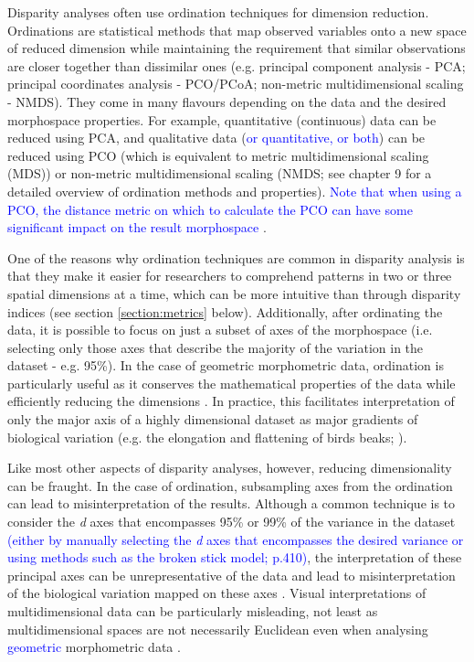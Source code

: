 \documentclass[12pt,letterpaper]{article}
\begin{document}
Disparity analyses often use ordination techniques for dimension reduction.
Ordinations are statistical methods that map observed variables onto a new space of reduced dimension while maintaining the requirement that similar observations are closer together than dissimilar ones (e.g. principal component analysis - PCA; principal coordinates analysis - PCO/PCoA; non-metric multidimensional scaling - NMDS).
They come in many flavours depending on the data and the desired morphospace properties.
For example, quantitative (continuous) data can be reduced using PCA, and qualitative data (\textcolor{blue}{or quantitative, or both}) can be reduced using PCO (which is equivalent to metric multidimensional scaling (MDS)) or non-metric multidimensional scaling (NMDS; see \citealt{Legendre2012} chapter 9 for a detailed overview of ordination methods and properties).
\textcolor{blue}{Note that when using a PCO, the distance metric on which to calculate the PCO can have some significant impact on the result morphospace} \citep{lehmann2019}.

One of the reasons why ordination techniques are common in disparity analysis is that they make it easier for researchers to comprehend patterns in two or three spatial dimensions at a time, which can be more intuitive than through disparity indices (see section \ref{section:metrics} below).
Additionally, after ordinating the data, it is possible to focus on just a subset of axes of the morphospace (i.e.
selecting only those axes that describe the majority of the variation in the dataset - e.g. 95\%).
In the case of geometric morphometric data, ordination is particularly useful as it conserves the mathematical properties of the data while efficiently reducing the dimensions \citep{Legendre2012,dryden2016statistical}.
In practice, this facilitates interpretation of only the major axis of a highly dimensional dataset as major gradients of biological variation (e.g. the elongation and flattening of birds beaks; \citealt{bright2016shapes}).

Like most other aspects of disparity analyses, however, reducing dimensionality can be fraught.
In the case of ordination, subsampling axes from the ordination can lead to misinterpretation of the results.
Although a common technique is to consider the \textit{d} axes that encompasses 95\% or 99\% of the variance in the dataset \textcolor{blue}{(either by manually selecting the \textit{d} axes that encompasses the desired variance or using methods such as the broken stick model; \citealt{Legendre2012} p.410)}, the interpretation of these principal axes can be unrepresentative of the data and lead to misinterpretation of the biological variation mapped on these axes \citep{Bookstein2015, Weisbecker2019}.
Visual interpretations of multidimensional data can be particularly misleading, not least as multidimensional spaces are not necessarily Euclidean even when analysing \textcolor{blue}{geometric} morphometric data \citep{Deline2018, Gerber2017}.
\end{document}
